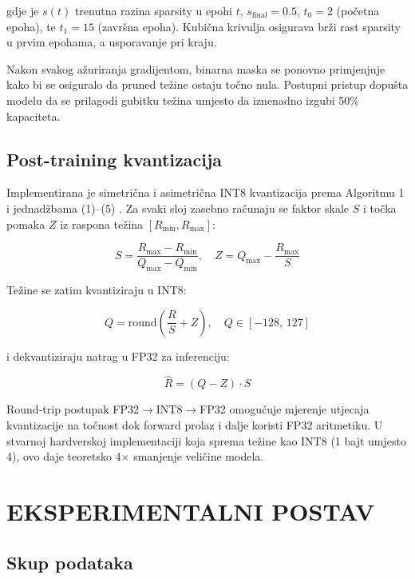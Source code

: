 \documentclass[letterpaper, 10 pt, conference]{ieeeconf}
\begin{document}
gdje je $s(t)$ trenutna razina sparsity u epohi $t$, $s_{\text{final}}=0.5$, $t_0=2$ (početna epoha), te $t_1=15$ (završna epoha).
Kubična krivulja osigurava brži rast sparsity u prvim epohama, a usporavanje pri kraju.

Nakon svakog ažuriranja gradijentom, binarna maska se ponovno primjenjuje kako bi se osiguralo da pruned težine ostaju točno nula.
Postupni pristup dopušta modelu da se prilagodi gubitku težina umjesto da iznenadno izgubi 50\% kapaciteta.

\subsection{Post-training kvantizacija}

Implementirana je simetrična i asimetrična INT8 kvantizacija prema Algoritmu 1 i jednadžbama (1)--(5) \cite{li2023survey}.
Za svaki sloj zasebno računaju se faktor skale $S$ i točka pomaka $Z$ iz raspona težina $[R_{\min}, R_{\max}]$:

\begin{equation}
  S = \frac{R_{\max} - R_{\min}}{Q_{\max} - Q_{\min}}, \quad
  Z = Q_{\max} - \frac{R_{\max}}{S}
\end{equation}

Težine se zatim kvantiziraju u INT8:

\begin{equation}
  Q = \mathrm{round}\!\left(\frac{R}{S} + Z\right), \quad Q \in [-128,\,127]
\end{equation}

i dekvantiziraju natrag u FP32 za inferenciju:

\begin{equation}
  \hat{R} = (Q - Z) \cdot S
\end{equation}

Round-trip postupak FP32$\rightarrow$INT8$\rightarrow$FP32 omogućuje mjerenje utjecaja kvantizacije na točnost dok forward prolaz i dalje koristi FP32 aritmetiku.
U stvarnoj hardverskoj implementaciji koja sprema težine kao INT8 (1 bajt umjesto 4), ovo daje teoretsko 4$\times$ smanjenje veličine modela.

\section{\textbf{EKSPERIMENTALNI POSTAV}}

\subsection{Skup podataka}
\end{document}
